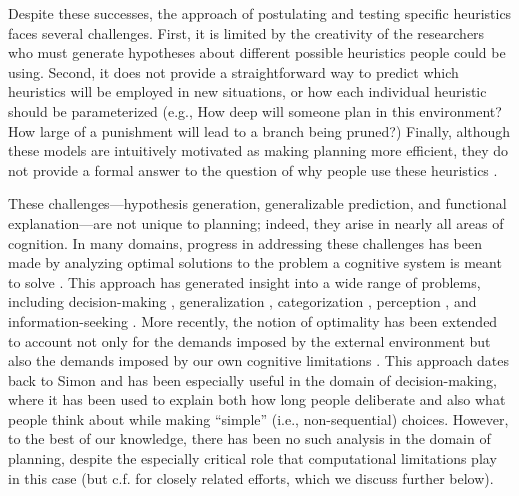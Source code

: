 Despite these successes, the approach of postulating and testing specific heuristics faces several challenges. First, it is limited by the creativity of the researchers who must generate hypotheses about different possible heuristics people could be using. Second, it does not provide a straightforward way to predict which heuristics will be employed in new situations, or how each individual heuristic should be parameterized (e.g., How deep will someone plan in this environment? How large of a punishment will lead to a branch being pruned?) Finally, although these models are intuitively motivated as making planning more efficient, they do not provide a formal answer to the question of why people use these heuristics \citep{norris2021more}.

These challenges---hypothesis generation, generalizable prediction, and functional explanation---are not unique to planning; indeed, they arise in nearly all areas of cognition. In many domains, progress in addressing these challenges has been made by analyzing optimal solutions to the problem a cognitive system is meant to solve \citep{marr1982vision,anderson1990adaptive}. This approach has generated insight into a wide range of problems, including decision-making \citep{savage1954foundations}, generalization \citep{tenenbaum2001generalization}, categorization \citep{anderson1991adaptive,ashby1995categorization}, perception \citep{knill1996perception}, and information-seeking \citep{oaksford1994rational,gureckis2012selfdirected}. More recently, the notion of optimality has been extended to account not only for the demands imposed by the external environment but also the demands imposed by our own cognitive limitations \citep{howes2009rational,lewis2014computational,gershman2015computational,griffiths2015rational,lieder2020resourcerational}. This approach dates back to Simon \citep{simon1955behavioral} and has been especially useful in the domain of decision-making, where it has been used to explain both how long people deliberate \citep{bogacz2006physics,drugowitsch2012cost,tajima2016optimal,tajima2019optimal,fudenberg2018speed} and also what people think about \citep{callaway2021fixation,jang2021optimal} while making ``simple'' (i.e., non-sequential) choices. However, to the best of our knowledge, there has been no such analysis in the domain of planning, despite the especially critical role that computational limitations play in this case (but c.f. \citealp{sezener2019optimizing,mattar2018prioritized} for closely related efforts, which we discuss further below).


